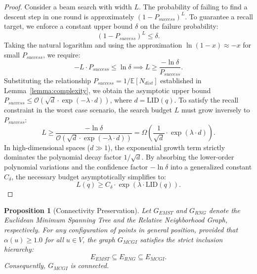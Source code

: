 \documentclass{article}
\theoremstyle{plain}
\newtheorem{proposition}[theorem]{Proposition}
\theoremstyle{definition}
\theoremstyle{remark}
\begin{document}
\begin{proof}
Consider a beam search with width $L$. The probability of failing to find a descent step in one round is approximately $(1 - P_{success})^L$. To guarantee a recall target, we enforce a constant upper bound $\delta$ on the failure probability:
\begin{equation}
    (1 - P_{success})^L \le \delta.
\end{equation}
Taking the natural logarithm and using the approximation $\ln(1-x) \approx -x$ for small $P_{success}$, we require:
\begin{equation}
    -L \cdot P_{success} \le \ln \delta \implies L \ge \frac{-\ln \delta}{P_{success}}.
\end{equation}
Substituting the relationship $P_{success} = 1 / \mathbb{E}[N_{dist}]$ established in Lemma~\ref{lemma:complexity}, we obtain the asymptotic upper bound $P_{success} \le \mathcal{O}( \sqrt{d} \cdot \exp(-\lambda \cdot d) )$, where $d = \text{LID}(q)$. To satisfy the recall constraint in the worst case scenario, the search budget $L$ must grow inversely to $P_{success}$:
\begin{equation}
    L \ge \frac{-\ln \delta}{\mathcal{O}( \sqrt{d} \cdot \exp(-\lambda \cdot d) )} = \Omega\left( \frac{1}{\sqrt{d}} \cdot \exp(\lambda \cdot d) \right).
\end{equation}
In high-dimensional spaces ($d \gg 1$), the exponential growth term strictly dominates the polynomial decay factor $1 / \sqrt{d}$. By absorbing the lower-order polynomial variations and the confidence factor $-\ln \delta$ into a generalized constant $C_{\delta}$, the necessary budget asymptotically simplifies to:
\begin{equation}
    L(q) \ge C_{\delta} \cdot \exp(\lambda \cdot \text{LID}(q)).
\end{equation}
\end{proof}

\begin{proposition}[Connectivity Preservation]
\label{proof:connectivity}
Let $G_{EMST}$ and $G_{RNG}$ denote the Euclidean Minimum Spanning Tree and the Relative Neighborhood Graph, respectively. For any configuration of points in general position, provided that $\alpha(u) \ge 1.0$ for all $u \in V$, the graph $G_{MCGI}$ satisfies the strict inclusion hierarchy:
\begin{equation}
    E_{EMST} \subseteq E_{RNG} \subseteq E_{MCGI}.
\end{equation}
Consequently, $G_{MCGI}$ is connected.
\end{proposition}
\end{document}
